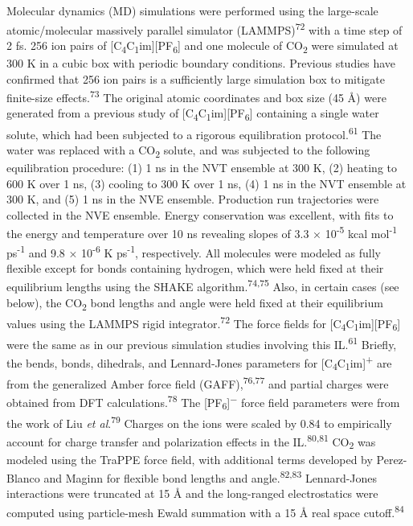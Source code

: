 \documentclass[]{article}
\begin{document}
Molecular dynamics (MD) simulations were performed using the large-scale
atomic/molecular massively parallel simulator
(LAMMPS)\textsuperscript{72} with a time step of 2 fs. 256 ion pairs of
{[}C\textsubscript{4}C\textsubscript{1}im{]}{[}PF\textsubscript{6}{]}
and one molecule of CO\textsubscript{2} were simulated at 300 K in a
cubic box with periodic boundary conditions. Previous studies have
confirmed that 256 ion pairs is a sufficiently large simulation box to
mitigate finite-size effects.\textsuperscript{73} The original atomic
coordinates and box size (45 Å) were generated from a previous study of
{[}C\textsubscript{4}C\textsubscript{1}im{]}{[}PF\textsubscript{6}{]}
containing a single water solute, which had been subjected to a rigorous
equilibration protocol.\textsuperscript{61} The water was replaced with
a CO\textsubscript{2} solute, and was subjected to the following
equilibration procedure: (1) 1 ns in the NVT ensemble at 300 K, (2)
heating to 600 K over 1 ns, (3) cooling to 300 K over 1 ns, (4) 1 ns in
the NVT ensemble at 300 K, and (5) 1 ns in the NVE ensemble. Production
run trajectories were collected in the NVE ensemble. Energy conservation
was excellent, with fits to the energy and temperature over 10 ns
revealing slopes of 3.3 × 10\textsuperscript{-5} kcal
mol\textsuperscript{-1} ps\textsuperscript{-1} and 9.8 ×
10\textsuperscript{-6} K ps\textsuperscript{-1}, respectively. All
molecules were modeled as fully flexible except for bonds containing
hydrogen, which were held fixed at their equilibrium lengths using the
SHAKE algorithm.\textsuperscript{74,75} Also, in certain cases (see
below), the CO\textsubscript{2} bond lengths and angle were held fixed
at their equilibrium values using the LAMMPS rigid
integrator.\textsuperscript{72} The force fields for
{[}C\textsubscript{4}C\textsubscript{1}im{]}{[}PF\textsubscript{6}{]}
were the same as in our previous simulation studies involving this
IL.\textsuperscript{61} Briefly, the bends, bonds, dihedrals, and
Lennard-Jones parameters for
{[}C\textsubscript{4}C\textsubscript{1}im{]}\textsuperscript{+} are from
the generalized Amber force field (GAFF),\textsuperscript{76,77} and
partial charges were obtained from DFT calculations.\textsuperscript{78}
The {[}PF\textsubscript{6}{]}\textsuperscript{−} force field parameters
were from the work of Liu \emph{et al}.\textsuperscript{79} Charges on
the ions were scaled by 0.84 to empirically account for charge transfer
and polarization effects in the IL.\textsuperscript{80,81}
CO\textsubscript{2} was modeled using the TraPPE force field, with
additional terms developed by Perez-Blanco and Maginn for flexible bond
lengths and angle.\textsuperscript{82,83} Lennard-Jones interactions
were truncated at 15 Å and the long-ranged electrostatics were computed
using particle-mesh Ewald summation with a 15 Å real space
cutoff.\textsuperscript{84}
\end{document}
